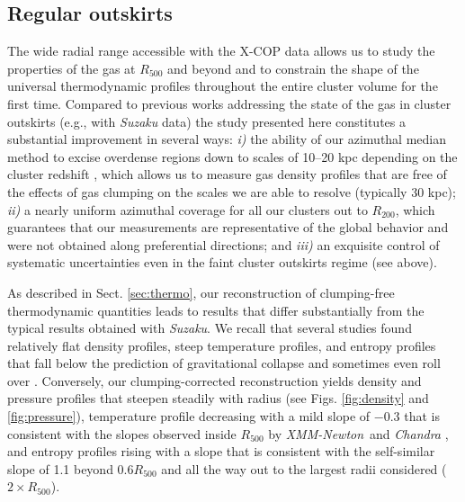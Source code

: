 \documentclass[traditabstract   ]{aa} %
\newcommand{\xmm}{{\it XMM-Newton}}
\begin{document}
\begin{itemize}

\end{itemize}

\subsection{Regular outskirts}

The wide radial range accessible with the X-COP data allows us to study the properties of the gas at $R_{500}$ and beyond and to constrain the shape of the universal thermodynamic profiles throughout the entire cluster volume for the first time. Compared to previous works addressing the state of the gas in cluster outskirts (e.g., with \emph{Suzaku} data) the study presented here constitutes a substantial improvement in several ways: \emph{i)} the ability of our azimuthal median method to excise overdense regions down to scales of 10--20 kpc depending on the cluster redshift \citep{eckert15}, which allows us to measure gas density profiles that are free of the effects of gas clumping on the scales we are able to resolve (typically  30 kpc); \emph{ii)} a nearly uniform azimuthal coverage for all our clusters out to $R_{200}$, which guarantees that our measurements are representative of the global behavior and were not obtained along preferential directions; and \emph{iii)} an exquisite control of systematic uncertainties even in the faint cluster outskirts regime (see above).

As described in Sect. \ref{sec:thermo}, our reconstruction of clumping-free thermodynamic quantities leads to results that differ substantially from the typical results obtained with \emph{Suzaku}. We recall that several studies found relatively flat density profiles, steep temperature profiles, and entropy profiles that fall below the prediction of gravitational collapse and sometimes even roll over \citep[e.g.,][]{kawa10,walker12a,walker12b,urban14,simi17}. Conversely, our clumping-corrected reconstruction yields density and pressure profiles that steepen steadily with radius (see Figs. \ref{fig:density} and \ref{fig:pressure}), temperature profile decreasing with a mild slope of $-0.3$ that is consistent with the slopes observed inside $R_{500}$ by \xmm\ and \emph{Chandra} \citep{lm08,pratt07,vikhlini+06}, and entropy profiles rising with a slope that is consistent with the self-similar slope of 1.1 beyond $0.6 R_{500}$ and all the way out to the largest radii considered ($2\times R_{500}$). 
\end{document}
